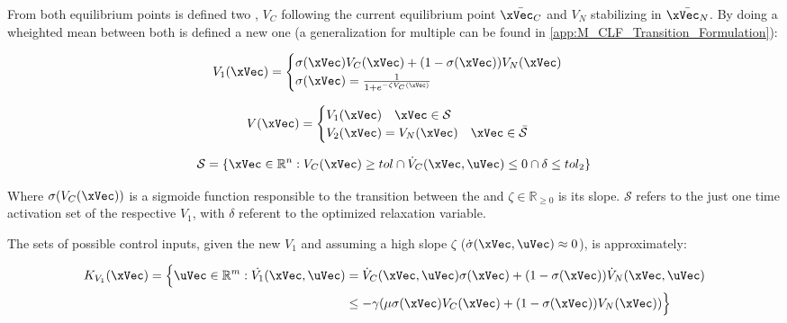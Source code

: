 From both equilibrium points is defined two , \(V_C\) following the current equilibrium point \(\bar{\xVec_C}\) and \(V_N\) stabilizing in \(\bar{\xVec_N}\). By doing a wheighted mean between both  is defined a new one (a generalization for multiple  can be found in \ref{app:M_CLF_Transition_Formulation}):

\begin{align}
    V_1(\xVec) = 
    \begin{cases}
        \sigma(\xVec) V_{C}(\xVec) + (1 - \sigma(\xVec))V_{N}(\xVec) \\
        \sigma(\xVec) = \frac{1}{1+e^{-\zeta V_{C}(\xVec)}} 
    \end{cases}
    \label{eq:1stPhase_2-CLF-S}
\end{align}

\begin{align}
    V(\xVec) = 
    \begin{cases}
        V_1(\xVec) \quad \xVec \in \mathcal{S}\\
        V_2(\xVec) = V_{N}(\xVec) \quad \xVec \in \bar{\mathcal{S}}
    \end{cases}
    \label{eq:New_2-CLF-S}
\end{align}

\begin{equation}
    \mathcal{S} = \{\xVec \in \mathbb{R}^n: V_{C}(\xVec) \geq tol \cap \dot{V}_{C}(\xVec, \uVec) \leq 0 \cap \delta \leq tol_2 \}
    \label{eq:New_2-CLF-S_actuationPhaseSet}
\end{equation}

Where \(\sigma(V_C(\xVec))\) is a sigmoide function responsible to the transition between the  and \(\zeta \in \mathbb{R}_{\geq 0}\) is its slope. \(\mathcal{S}\) refers to the just one time activation set of the respective  \(V_1\), with \(\delta\) referent to the   optimized relaxation variable. 



The sets of possible control inputs, given the new  \(V_1\) and assuming a high slope \(\zeta\) (\(\dot{\sigma}(\xVec, \uVec)\approx 0\)), is approximately:

\begin{align}
    K_{V_1}(\xVec) = \Bigl\{\uVec \in \mathbb{R}^m: \dot{V_1}(\xVec, \uVec) &= \dot{V}_{C}(\xVec, \uVec) \sigma(\xVec) + (1-\sigma(\xVec))\dot{V}_{N}(\xVec, \uVec) \notag \\
    &\leq -\gamma( \mu \sigma(\xVec) V_{C}(\xVec) + (1 - \sigma(\xVec))V_{N}(\xVec)  )\Bigr\}
    \label{eq:2-CLF-S_Constraint}
\end{align}


